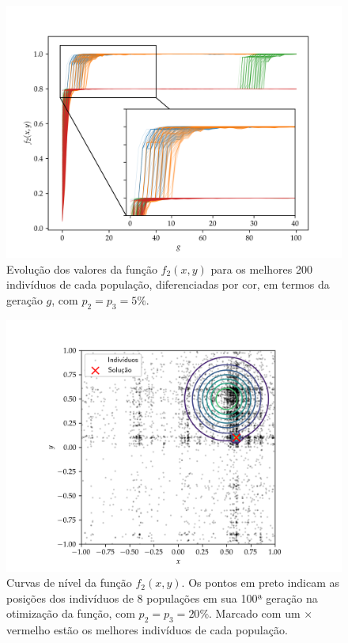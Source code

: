 \begin{figure}[p]
  \centering
  \includegraphics[width=\textwidth]{imagens/low_prob/evolution_near_gaussians.png}
  \caption{
    Evolução dos valores da função $ f_2(x,y) $ para os
    melhores 200 indivíduos de cada população, diferenciadas por cor, em termos da geração $g$,
    com $ p_2 = p_3 = 5\% $.
  }
  \label{fig:evolution_near_gaussians}
\end{figure}

\begin{figure}[p]
  \centering
  \includegraphics[width=\textwidth]{imagens/high_prob/contour_near_gaussians.png}
  \caption{
    Curvas de nível da função $f_2(x,y)$. Os pontos em preto indicam as posições dos indivíduos
    de 8 populações em sua 100ª geração na otimização da função, com $ p_2 = p_3 = 20\% $. 
    Marcado com um $\times$ vermelho estão os melhores indivíduos de cada população.
  }
  \label{fig:contour_near_gaussians_mut_20}
\end{figure}


